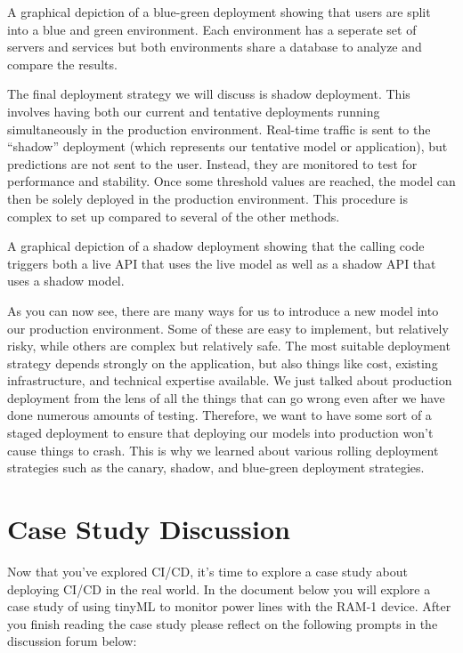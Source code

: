 {{{{    A graphical depiction of a blue-green deployment showing that users are split into a blue and green environment. Each environment has a seperate set of servers and services but both environments share a database to analyze and compare the results.
    
    The final deployment strategy we will discuss is shadow deployment. This involves having both our current and tentative deployments running simultaneously in the production environment. Real-time traffic is sent to the “shadow” deployment (which represents our tentative model or application), but predictions are not sent to the user. Instead, they are monitored to test for performance and stability. Once some threshold values are reached, the model can then be solely deployed in the production environment. This procedure is complex to set up compared to several of the other methods.
    
    
    A graphical depiction of a shadow deployment showing that the calling code triggers both a live API that uses the live model as well as a shadow API that uses a shadow model.
    
    As you can now see, there are many ways for us to introduce a new model into our production environment. Some of these are easy to implement, but relatively risky, while others are complex but relatively safe. The most suitable deployment strategy depends strongly on the application, but also things like cost, existing infrastructure, and technical expertise available. We just talked about production deployment from the lens of all the things that can go wrong even after we have done numerous amounts of testing. Therefore, we want to have some sort of a staged deployment to ensure that deploying our models into production won’t cause things to crash. This is why we learned about various rolling deployment strategies such as the canary, shadow, and blue-green deployment strategies.     
 
 \section{Case Study Discussion}   
 
Now that you’ve explored CI/CD, it's time to explore a case study about deploying CI/CD in the real world. In the document below you will explore a case study of using tinyML to monitor power lines with the RAM-1 device. After you finish reading the case study  please reflect on the following prompts in the discussion forum below:

}}}}
